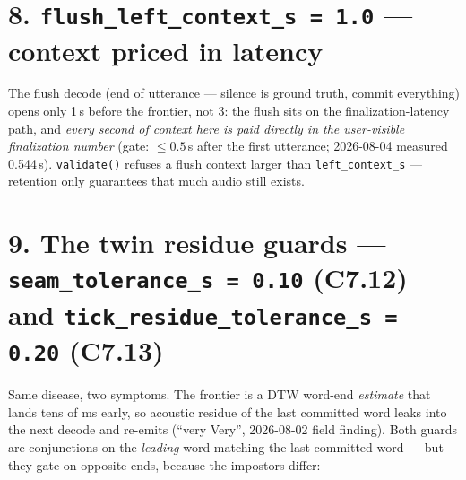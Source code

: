 \documentclass[11pt]{article}
\newcommand{\panelrow}[1]{\node[rowlbl] at (-0.2,0.25) {#1};}
\begin{document}
\section*{8. \texttt{flush\_left\_context\_s = 1.0} --- context priced in latency}

The flush decode (end of utterance --- silence is ground truth, commit
everything) opens only 1\,s before the frontier, not 3: the flush sits on the
finalization-latency path, and \emph{every second of context here is paid
directly in the user-visible finalization number} (gate: $\le 0.5$\,s after the
first utterance; 2026-08-04 measured 0.544\,s). \texttt{validate()} refuses a
flush context larger than \texttt{left\_context\_s} --- retention only
guarantees that much audio still exists.

\section*{9. The twin residue guards --- \texttt{seam\_tolerance\_s = 0.10} (C7.12) and \texttt{tick\_residue\_tolerance\_s = 0.20} (C7.13)}

Same disease, two symptoms. The frontier is a DTW word-end \emph{estimate} that
lands tens of ms early, so acoustic residue of the last committed word leaks
into the next decode and re-emits (``very Very'', 2026-08-02 field finding).
Both guards are conjunctions on the \emph{leading} word matching the last
committed word --- but they gate on opposite ends, because the impostors differ:

\begin{center}
\end{center}
\end{document}

